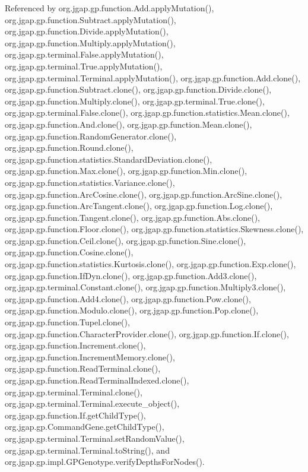Referenced by org.\-jgap.\-gp.\-function.\-Add.\-apply\-Mutation(), org.\-jgap.\-gp.\-function.\-Subtract.\-apply\-Mutation(), org.\-jgap.\-gp.\-function.\-Divide.\-apply\-Mutation(), org.\-jgap.\-gp.\-function.\-Multiply.\-apply\-Mutation(), org.\-jgap.\-gp.\-terminal.\-False.\-apply\-Mutation(), org.\-jgap.\-gp.\-terminal.\-True.\-apply\-Mutation(), org.\-jgap.\-gp.\-terminal.\-Terminal.\-apply\-Mutation(), org.\-jgap.\-gp.\-function.\-Add.\-clone(), org.\-jgap.\-gp.\-function.\-Subtract.\-clone(), org.\-jgap.\-gp.\-function.\-Divide.\-clone(), org.\-jgap.\-gp.\-function.\-Multiply.\-clone(), org.\-jgap.\-gp.\-terminal.\-True.\-clone(), org.\-jgap.\-gp.\-terminal.\-False.\-clone(), org.\-jgap.\-gp.\-function.\-statistics.\-Mean.\-clone(), org.\-jgap.\-gp.\-function.\-And.\-clone(), org.\-jgap.\-gp.\-function.\-Mean.\-clone(), org.\-jgap.\-gp.\-function.\-Random\-Generator.\-clone(), org.\-jgap.\-gp.\-function.\-Round.\-clone(), org.\-jgap.\-gp.\-function.\-statistics.\-Standard\-Deviation.\-clone(), org.\-jgap.\-gp.\-function.\-Max.\-clone(), org.\-jgap.\-gp.\-function.\-Min.\-clone(), org.\-jgap.\-gp.\-function.\-statistics.\-Variance.\-clone(), org.\-jgap.\-gp.\-function.\-Arc\-Cosine.\-clone(), org.\-jgap.\-gp.\-function.\-Arc\-Sine.\-clone(), org.\-jgap.\-gp.\-function.\-Arc\-Tangent.\-clone(), org.\-jgap.\-gp.\-function.\-Log.\-clone(), org.\-jgap.\-gp.\-function.\-Tangent.\-clone(), org.\-jgap.\-gp.\-function.\-Abs.\-clone(), org.\-jgap.\-gp.\-function.\-Floor.\-clone(), org.\-jgap.\-gp.\-function.\-statistics.\-Skewness.\-clone(), org.\-jgap.\-gp.\-function.\-Ceil.\-clone(), org.\-jgap.\-gp.\-function.\-Sine.\-clone(), org.\-jgap.\-gp.\-function.\-Cosine.\-clone(), org.\-jgap.\-gp.\-function.\-statistics.\-Kurtosis.\-clone(), org.\-jgap.\-gp.\-function.\-Exp.\-clone(), org.\-jgap.\-gp.\-function.\-If\-Dyn.\-clone(), org.\-jgap.\-gp.\-function.\-Add3.\-clone(), org.\-jgap.\-gp.\-terminal.\-Constant.\-clone(), org.\-jgap.\-gp.\-function.\-Multiply3.\-clone(), org.\-jgap.\-gp.\-function.\-Add4.\-clone(), org.\-jgap.\-gp.\-function.\-Pow.\-clone(), org.\-jgap.\-gp.\-function.\-Modulo.\-clone(), org.\-jgap.\-gp.\-function.\-Pop.\-clone(), org.\-jgap.\-gp.\-function.\-Tupel.\-clone(), org.\-jgap.\-gp.\-function.\-Character\-Provider.\-clone(), org.\-jgap.\-gp.\-function.\-If.\-clone(), org.\-jgap.\-gp.\-function.\-Increment.\-clone(), org.\-jgap.\-gp.\-function.\-Increment\-Memory.\-clone(), org.\-jgap.\-gp.\-function.\-Read\-Terminal.\-clone(), org.\-jgap.\-gp.\-function.\-Read\-Terminal\-Indexed.\-clone(), org.\-jgap.\-gp.\-terminal.\-Terminal.\-clone(), org.\-jgap.\-gp.\-terminal.\-Terminal.\-execute\-\_\-object(), org.\-jgap.\-gp.\-function.\-If.\-get\-Child\-Type(), org.\-jgap.\-gp.\-Command\-Gene.\-get\-Child\-Type(), org.\-jgap.\-gp.\-terminal.\-Terminal.\-set\-Random\-Value(), org.\-jgap.\-gp.\-terminal.\-Terminal.\-to\-String(), and org.\-jgap.\-gp.\-impl.\-G\-P\-Genotype.\-verify\-Depths\-For\-Nodes().

